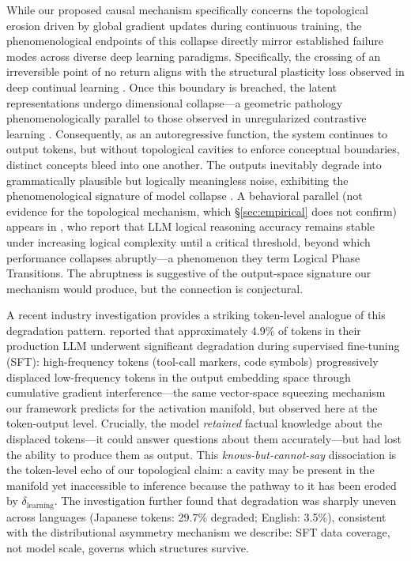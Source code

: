 \documentclass{article}
\begin{document}
While our proposed causal mechanism specifically concerns the topological erosion driven by global gradient updates during continuous training, the phenomenological endpoints of this collapse directly mirror established failure modes across diverse deep learning paradigms. Specifically, the crossing of an irreversible point of no return aligns with the structural plasticity loss observed in deep continual learning \citep{Dohare2024plasticity}. Once this boundary is breached, the latent representations undergo dimensional collapse---a geometric pathology phenomenologically parallel to those observed in unregularized contrastive learning \citep{Jing2022dimensional}. Consequently, as an autoregressive function, the system continues to output tokens, but without topological cavities to enforce conceptual boundaries, distinct concepts bleed into one another. The outputs inevitably degrade into grammatically plausible but logically meaningless noise, exhibiting the phenomenological signature of model collapse \citep{Shumailov2023curse}. A behavioral parallel (not evidence for the topological mechanism, which \S\ref{sec:empirical} does not confirm) appears in \citet{Zhang2026logical}, who report that LLM logical reasoning accuracy remains stable under increasing logical complexity until a critical threshold, beyond which performance collapses abruptly---a phenomenon they term Logical Phase Transitions. The abruptness is suggestive of the output-space signature our mechanism would produce, but the connection is conjectural.

A recent industry investigation provides a striking token-level analogue of this degradation pattern. \citet{MiniMax2026sparse} reported that approximately 4.9\% of tokens in their production LLM underwent significant degradation during supervised fine-tuning (SFT): high-frequency tokens (tool-call markers, code symbols) progressively displaced low-frequency tokens in the output embedding space through cumulative gradient interference---the same vector-space squeezing mechanism our framework predicts for the activation manifold, but observed here at the token-output level. Crucially, the model \emph{retained} factual knowledge about the displaced tokens---it could answer questions about them accurately---but had lost the ability to produce them as output. This \emph{knows-but-cannot-say} dissociation is the token-level echo of our topological claim: a cavity may be present in the manifold yet inaccessible to inference because the pathway to it has been eroded by $\delta_{\text{learning}}$. The investigation further found that degradation was sharply uneven across languages (Japanese tokens: 29.7\% degraded; English: 3.5\%), consistent with the distributional asymmetry mechanism we describe: SFT data coverage, not model scale, governs which structures survive.
\end{document}
